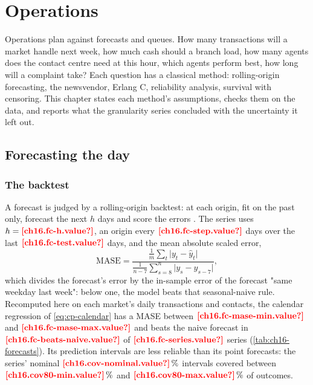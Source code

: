 \chapter{Operations}\label{ch:operations}

Operations plan against forecasts and queues. How many transactions will a market handle next week, how much cash should a
branch load, how many agents does the contact centre need at this hour, which agents perform best, how long will a complaint
take? Each question has a classical method: rolling-origin forecasting, the newsvendor, Erlang C, reliability analysis,
survival with censoring. This chapter states each method's assumptions, checks them on the data, and reports what the
granularity series concluded with the uncertainty it left out.

\section{Forecasting the day}\label{sec:op-forecast}

\subsection{The backtest}

A forecast is judged by a rolling-origin backtest: at each origin, fit on the past only, forecast the next $h$ days and score
the errors \autocite{hyndman2006}. The series uses $h = \est{ch16.fc-h}{value}$, an origin every $\est{ch16.fc-step}{value}$ days
over the last $\est{ch16.fc-test}{value}$ days, and the mean absolute scaled error,
\begin{equation}\label{eq:op-mase}
  \mathrm{MASE} = \frac{\frac{1}{m} \sum_{t} \lvert y_t - \hat y_t \rvert}
                       {\frac{1}{n - 7} \sum_{s=8}^{n} \lvert y_s - y_{s-7} \rvert},
\end{equation}
which divides the forecast's error by the in-sample error of the forecast "same weekday last week": below one, the model beats
that seasonal-naive rule. Recomputed here on each market's daily transactions and contacts, the calendar regression of
\cref{eq:cp-calendar} has a MASE between $\est{ch16.fc-mase-min}{value}$ and $\est{ch16.fc-mase-max}{value}$ and beats the naive
forecast in $\est{ch16.fc-beats-naive}{value}$ of $\est{ch16.fc-series}{value}$ series (\cref{tab:ch16-forecasts}). Its
prediction intervals are less reliable than its point forecasts: the series' nominal $\est{ch16.cov-nominal}{value}\,\%$ intervals covered between
$\est{ch16.cov80-min}{value}\,\%$ and $\est{ch16.cov80-max}{value}\,\%$ of outcomes.

